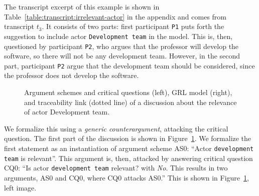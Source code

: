 The transcript excerpt of this example is shown in Table~\ref{table:transcript:irrelevant-actor} in the appendix and comes from transcript $t_3$. It consists of two parts: first participant \texttt{P1} puts forth the suggestion to include actor \texttt{Development team} in the model. This is, then, questioned by participant \texttt{P2}, who argues that the professor will develop the software, so there will not be any development team. However, in the second part, participant \texttt{P2} argue that the development team should be considered, since the professor does not develop the software.

\begin{figure}[ht!]
\centering
\caption{Argument schemes and critical questions (left), GRL model (right), and traceability link (dotted line) of a discussion about the relevance of actor Development team.}
\label{fig:examples:relevant-actor}
\end{figure}

We formalize this using a \emph{generic counterargument}, attacking the critical question. The first part of the discussion is shown in Figure~\ref{fig:examples:relevant-actor}. We formalize the first statement as an instantiation of argument scheme AS0: ``Actor \texttt{development team} is relevant''. This argument is, then, attacked by answering critical question CQ0: ``Is actor \texttt{development team} relevant? with \emph{No}. This results in two arguments, AS0 and CQ0, where CQ0 attacks AS0.'' This is shown in Figure~\ref{fig:examples:relevant-actor}, left image.

